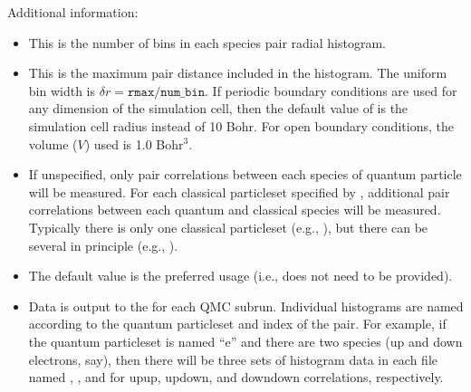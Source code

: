 \documentclass[letterpaper,10pt,english]{sphinxmanual}
\begin{document}
Additional information:
\begin{itemize}
\item {} 
 This is the number of bins in each species pair radial
histogram.

\item {} 
 This is the maximum pair distance included in the
histogram. The uniform bin width is
\(\delta r=\texttt{rmax/num\_bin}\). If periodic boundary
conditions are used for any dimension of the simulation cell, then
the default value of  is the simulation cell radius instead
of 10 Bohr. For open boundary conditions, the volume (\(V\)) used
is 1.0 Bohr\(^3\).

\item {} 
 If unspecified, only pair correlations between
each species of quantum particle will be measured. For each classical
particleset specified by , additional pair
correlations between each quantum and classical species will be
measured. Typically there is only one classical particleset (e.g.,
), but there can be several in principle (e.g.,
).

\item {} 
 The default value is the preferred usage (i.e.,
 does not need to be provided).

\item {} 
Data is output to the  for each QMC subrun. Individual
histograms are named according to the quantum particleset and index
of the pair. For example, if the quantum particleset is named “e” and
there are two species (up and down electrons, say), then there will
be three sets of histogram data in each  file named
, , and  for up\sphinxhyphen{}up,
up\sphinxhyphen{}down, and down\sphinxhyphen{}down correlations, respectively.

\end{itemize}
\def\sphinxLiteralBlockLabel{\label{\detokenize{hamiltonianobservable:listing-27}}}
\begin{sphinxVerbatim}[commandchars=\\\{\}]
     
\end{sphinxVerbatim}
\end{document}
